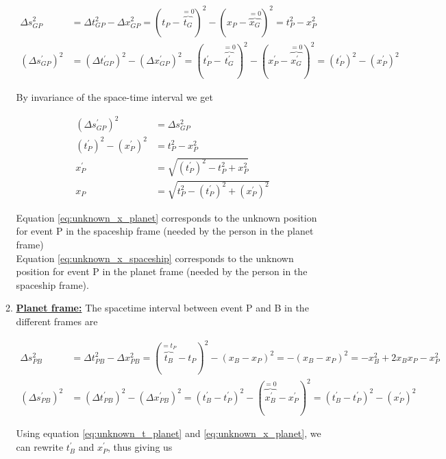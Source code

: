 \documentclass[a4paper,10pt,english]{article}
\begin{document}
\begin{enumerate}
\begin{enumerate}
\begin{align*}
\Delta s_{GP}^2&=\Delta t_{GP}^2-\Delta x_{GP}^2=(t_{P}-\overbrace{t_{G}}^{=0})^2-(x_{P}-\overbrace{x_{G}}^{=0})^2=t_{P}^2-x_{P}^2\\
(\Delta s_{GP}^{\prime})^2&=(\Delta t_{GP}^{\prime})^2-(\Delta x_{GP}^{\prime})^2=(t_{P}^{\prime}-\overbrace{t^{\prime}_{G}}^{=0})^2-(x_{P}^{\prime}-\overbrace{x^{\prime}_{G}}^{=0})^2=(t_{P}^{\prime})^2-(x_{P}^{\prime})^2
\end{align*}

By invariance of the space-time interval we get

\begin{align}
(\Delta s_{GP}^{\prime})^2&=\Delta s_{GP}^2 \nonumber\\
(t^{\prime}_{P})^{2}-(x^{\prime}_{P})^{2}&=t_{P}^{2}-x_{P}^{2} \nonumber\\
x^{\prime}_{P}&=\sqrt{(t^{\prime}_{P})^{2}-t_{P}^{2}+x_{P}^{2}} \label{eq:unknown_x_planet}\\
x_{P}&=\sqrt{t_{P}^{2}-(t^{\prime}_{P})^{2}+(x^{\prime}_{P})^{2}} \label{eq:unknown_x_spaceship}
\end{align}

Equation \ref{eq:unknown_x_planet} corresponds to the unknown position for event P in the spaceship frame (needed by the person in the planet frame)\\
Equation \ref{eq:unknown_x_spaceship} corresponds to the unknown position for event P in the planet frame (needed by the person in the spaceship frame).


\item \underline{\bf{Planet frame:}} The spacetime interval between event P and B in the different frames are

\begin{align*}
\Delta s_{PB}^2&=\Delta t_{PB}^2-\Delta x_{PB}^2=(\overbrace{t_{B}}^{=t_{P}}-t_{P})^2-(x_{B}-x_{P})^2=-(x_{B}-x_{P})^2=-x_{B}^2+2x_{B}x_{P}-x_{P}^2\\
(\Delta s_{PB}^{\prime})^2&=(\Delta t_{PB}^{\prime})^2-(\Delta x_{PB}^{\prime})^2=(t_{B}^{\prime}-t^{\prime}_{P})^2-(\overbrace{x_{B}^{\prime}}^{=0}-x^{\prime}_{P})^2=(t_{B}^{\prime}-t^{\prime}_{P})^2-(x^{\prime}_{P})^2
\end{align*}

Using equation \ref{eq:unknown_t_planet} and \ref{eq:unknown_x_planet}, we can rewrite $t^{\prime}_{B}$ and $x^{\prime}_{P}$, thus giving us 


\end{enumerate}
\end{enumerate}
\end{document}
